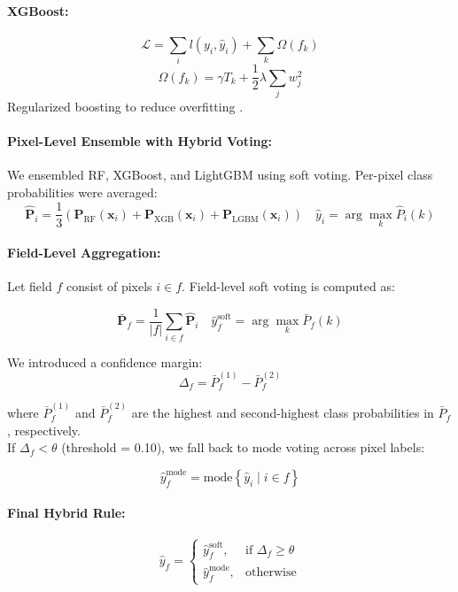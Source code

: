 \documentclass[pdflatex,sn-mathphys]{sn-jnl} %
\begin{document}
\paragraph{XGBoost:}
  \[
  \mathcal{L} = \sum_i l(y_i, \hat{y}_i) + \sum_k \Omega(f_k)
  \]
  \[
  \Omega(f_k) = \gamma T_k + \frac{1}{2}\lambda \sum_j w_j^2
  \]
  Regularized boosting to reduce overfitting \cite{chen2016, friedman2001}.

\paragraph{Pixel-Level Ensemble with Hybrid Voting:}

We ensembled RF, XGBoost, and LightGBM using soft voting. Per-pixel class probabilities were averaged:
\[
\hat{\mathbf{P}}_i = \frac{1}{3} \left( \mathbf{P}_{\text{RF}}(\mathbf{x}_i) + \mathbf{P}_{\text{XGB}}(\mathbf{x}_i) + \mathbf{P}_{\text{LGBM}}(\mathbf{x}_i) \right)
\quad
\hat{y}_i = \arg\max_k \hat{P}_i(k)
\]

\paragraph{Field-Level Aggregation:}

Let field \( f \) consist of pixels \( i \in f \). Field-level soft voting is computed as:

\[
\bar{\mathbf{P}}_f = \frac{1}{|f|} \sum_{i \in f} \hat{\mathbf{P}}_i
\quad
\hat{y}_f^{\text{soft}} = \arg\max_k \bar{P}_f(k)
\]

We introduced a confidence margin:
\[
\Delta_f = \bar{P}_f^{(1)} - \bar{P}_f^{(2)}
\]

where \(\bar{P}_f^{(1)}\) and \(\bar{P}_f^{(2)}\) are the highest and second-highest class probabilities in \(\bar{P}_f\), respectively.\\

If \( \Delta_f < \theta \) (threshold = 0.10), we fall back to mode voting across pixel labels:

\[
\hat{y}_f^{\text{mode}} = \text{mode} \left\lbrace \hat{y}_i \mid i \in f \right\rbrace
\]

\paragraph{Final Hybrid Rule:}
\[
\hat{y}_f =
\begin{cases}
\hat{y}_f^{\text{soft}}, & \text{if } \Delta_f \geq \theta \\
\hat{y}_f^{\text{mode}}, & \text{otherwise}
\end{cases}
\]
\end{document}
